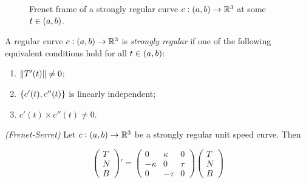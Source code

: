 \begin{figure}[h!tb]
	\centering
	\caption{Frenet frame of a strongly regular curve $c: \intoo{a,b} \to \mathbb{R}^3$ at some $t \in \intoo{a,b}$.}
\end{figure}

\begin{definition}
	A regular curve $c: \intoo{a,b} \to \mathbb{R}^3$ is \emph{strongly regular} if one of the following equivalent conditions hold for all $t \in \intoo{a,b}$:

	\begin{enumerate}[label = (\roman*)]
		\item $\norm[0]{T'(t)} \neq 0$;
		\item $\cbr[0]{c'(t),c''(t)}$ is linearly independent;
		\item $c'(t) \times c''(t) \neq 0$.
	\end{enumerate}
\end{definition}

\vspace{1mm}

\begin{theorem}\emph{(Frenet-Serret)}
	Let $c: \intoo{a,b} \to \mathbb{R}^3$ be a strongly regular unit speed curve. Then

	\begin{equation}
		\begin{pmatrix}
			T\\
			N\\
			B
		\end{pmatrix}' = \begin{pmatrix}
			0 & \kappa & 0\\
			-\kappa & 0 & \tau\\
			0 & -\tau & 0
		\end{pmatrix}\begin{pmatrix}
			T\\
			N\\
			B
		\end{pmatrix}
	\end{equation}
\end{theorem}

